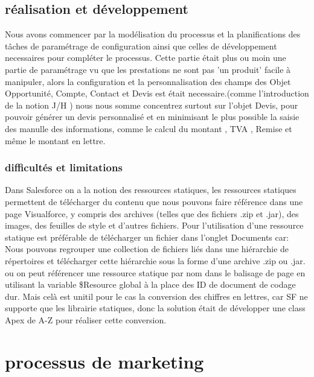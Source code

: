 \documentclass[a4paper, 12pt]{report}
\begin{document}
\begin{itemize}
\subsection{réalisation et développement}
Nous avons commencer par la  modélisation du processus et la planifications des tâches de paramétrage de configuration ainsi que celles de développement necessaires pour compléter le processus.
Cette partie était plus ou moin une partie de paramétrage vu que les prestations ne sont pas 'un produit'  facile à manipuler, alors la configuration  et la personnalisation des champs des Objet Opportunité, Compte, Contact et Devis est était necessaire.(comme l'introduction de la notion  J/H \footnotemark[1])
nous nous somme concentrez surtout sur l'objet Devis, pour pouvoir générer un devis personnalisé et en minimisant le plus possible la saisie des manulle des informations, comme le calcul du montant , TVA , Remise  et même le montant en lettre.
\subsubsection{difficultés et limitations}
Dans Salesforce on a la notion des ressources statiques, les ressources statiques permettent de télécharger du contenu que nous pouvons faire référence dans une page Visualforce, y compris des archives (telles que des fichiers .zip et .jar), des images, des feuilles de style et d'autres fichiers.
Pour l'utilisation d'une ressource statique est préférable de télécharger un fichier dans l'onglet Documents car:
    Nous pouvons regrouper une collection de fichiers liés dans une hiérarchie de répertoires et télécharger cette hiérarchie sous la forme d'une archive .zip ou .jar.
    ou on peut référencer une ressource statique par nom dans le balisage de page en utilisant la variable \$Resource global à la place des ID de document de codage dur.  Mais celà est unitil pour le cas la conversion des chiffres en lettres, car SF ne supporte que les librairie statiques, donc la solution était de développer une class Apex  de A-Z pour réaliser cette conversion.

\section {processus de marketing}

\end{itemize}
\end{document}
